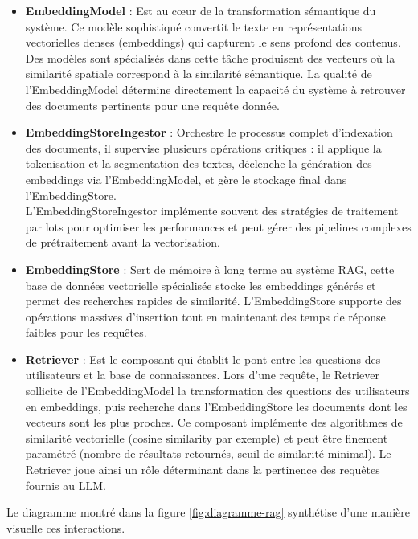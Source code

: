 \documentclass[12pt,a4paper]{report}
\begin{document}
\begin{itemize}
		\item \textbf{EmbeddingModel} : Est au cœur de la transformation sémantique du système. Ce modèle sophistiqué convertit le texte en représentations vectorielles denses (embeddings) qui capturent le sens profond des contenus. Des modèles sont spécialisés dans cette tâche produisent des vecteurs où la similarité spatiale correspond à la similarité sémantique. La qualité de l'EmbeddingModel détermine directement la capacité du système à retrouver des documents pertinents pour une requête donnée.
		
		\item \textbf{EmbeddingStoreIngestor} : Orchestre le processus complet d'indexation des documents, il supervise plusieurs opérations critiques : il applique la tokenisation et la segmentation des textes, déclenche la génération des embeddings via l'EmbeddingModel, et gère le stockage final dans l'EmbeddingStore. \\ L'EmbeddingStoreIngestor implémente souvent des stratégies de traitement par lots pour optimiser les performances et peut gérer des pipelines complexes de prétraitement avant la vectorisation.
		
		\item \textbf{EmbeddingStore} : Sert de mémoire à long terme au système RAG, cette base de données vectorielle spécialisée stocke les embeddings générés et permet des recherches rapides de similarité. L'EmbeddingStore supporte des opérations massives d'insertion tout en maintenant des temps de réponse faibles pour les requêtes.
		
		\item \textbf{Retriever} : Est le composant qui établit le pont entre les questions des utilisateurs et la base de connaissances. Lors d'une requête, le Retriever sollicite de l'EmbeddingModel la transformation des questions des utilisateurs en embeddings, puis recherche dans l'EmbeddingStore les documents dont les vecteurs sont les plus proches. Ce composant implémente des algorithmes de similarité vectorielle (cosine similarity par exemple) et peut être finement paramétré (nombre de résultats retournés, seuil de similarité minimal). Le Retriever joue ainsi un rôle déterminant dans la pertinence des requêtes fournis au LLM.
		
	\end{itemize}
	
	Le diagramme montré dans la figure \ref{fig:diagramme-rag} synthétise d'une manière visuelle ces interactions.
	
\end{document}
